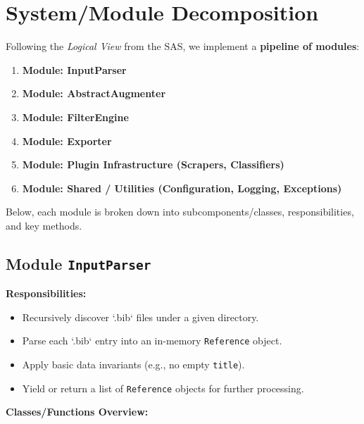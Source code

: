 \documentclass[12pt]{article}
\begin{document}
\section{System/Module Decomposition}

Following the \emph{Logical View} from the SAS, we implement a \textbf{pipeline of modules}:

\begin{enumerate}[label=\Roman*.]
  \item \textbf{Module: InputParser}
  \item \textbf{Module: AbstractAugmenter}
  \item \textbf{Module: FilterEngine}
  \item \textbf{Module: Exporter}
  \item \textbf{Module: Plugin Infrastructure (Scrapers, Classifiers)}
  \item \textbf{Module: Shared / Utilities (Configuration, Logging, Exceptions)}
\end{enumerate}

Below, each module is broken down into subcomponents/classes, responsibilities, and key methods.

\subsection{Module \texttt{InputParser}}
\textbf{Responsibilities:}
\begin{itemize}
  \item Recursively discover `.bib` files under a given directory.
  \item Parse each `.bib` entry into an in-memory \texttt{Reference} object.
  \item Apply basic data invariants (e.g., no empty \texttt{title}).
  \item Yield or return a list of \texttt{Reference} objects for further processing.
\end{itemize}

\textbf{Classes/Functions Overview:}
\end{document}
